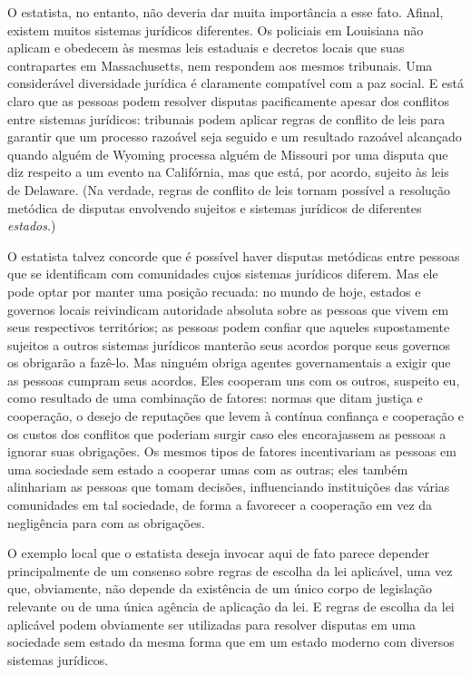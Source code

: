O estatista, no entanto, não deveria dar muita importância a esse fato. Afinal, existem muitos sistemas jurídicos diferentes. Os policiais em Louisiana não aplicam e obedecem às mesmas leis estaduais e decretos locais que suas contrapartes em Massachusetts, nem respondem aos mesmos tribunais. Uma considerável diversidade jurídica é claramente compatível com a paz social. E está claro que as pessoas podem resolver disputas pacificamente apesar dos conflitos entre sistemas jurídicos: tribunais podem aplicar regras de conflito de leis para garantir que um processo razoável seja seguido e um resultado razoável alcançado quando alguém de Wyoming processa alguém de Missouri por uma disputa que diz respeito a um evento na Califórnia, mas que está, por acordo, sujeito às leis de Delaware. (Na verdade, regras de conflito de leis tornam possível a resolução metódica de disputas envolvendo sujeitos e sistemas jurídicos de diferentes \emph{estados}.)

O estatista talvez concorde que é possível haver disputas metódicas entre pessoas que se identificam com comunidades cujos sistemas jurídicos diferem. Mas ele pode optar por manter uma posição recuada: no mundo de hoje, estados e governos locais reivindicam autoridade absoluta sobre as pessoas que vivem em seus respectivos territórios; as pessoas podem confiar que aqueles supostamente sujeitos a outros sistemas jurídicos manterão seus acordos porque seus governos os obrigarão a fazê-lo. Mas ninguém obriga agentes governamentais a exigir que as pessoas cumpram seus acordos. Eles cooperam uns com os outros, suspeito eu, como resultado de uma combinação de fatores: normas que ditam justiça e cooperação, o desejo de reputações que levem à contínua confiança e cooperação e os custos dos conflitos que poderiam surgir caso eles encorajassem as pessoas a ignorar suas obrigações. Os mesmos tipos de fatores incentivariam as pessoas em uma sociedade sem estado a cooperar umas com as outras; eles também alinhariam as pessoas que tomam decisões, influenciando instituições das várias comunidades em tal sociedade, de forma a favorecer a cooperação em vez da negligência para com as obrigações.

O exemplo local que o estatista deseja invocar aqui de fato parece depender principalmente de um consenso sobre regras de escolha da lei aplicável, uma vez que, obviamente, não depende da existência de um único corpo de legislação relevante ou de uma única agência de aplicação da lei. E regras de escolha da lei aplicável podem obviamente ser utilizadas para resolver disputas em uma sociedade sem estado da mesma forma que em um estado moderno com diversos sistemas jurídicos. 

